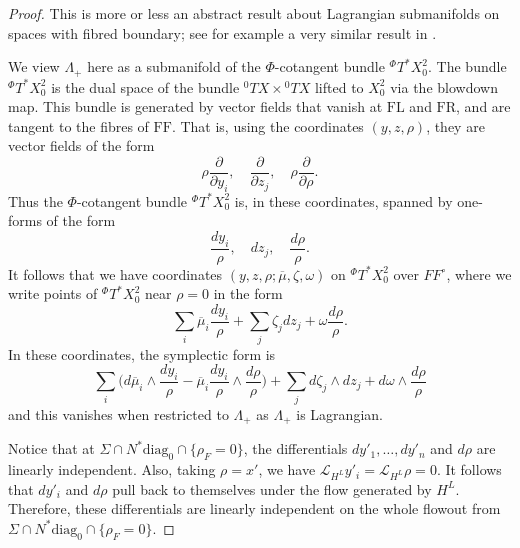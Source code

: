 \documentclass[10pt, a4paper, twoside]{amsart}
\numberwithin{equation}{section}
\theoremstyle{remark}
\begin{document}
\begin{proof} This is more or less an abstract result about Lagrangian submanifolds on spaces with fibred boundary; see for example a very similar result in \cite[Proposition 4.3]{Hassell-Wunsch}.

We view $\Lambda_+$ here as a submanifold of the $\Phi$-cotangent bundle ${}^\Phi T^* X^2_0$. The bundle ${}^\Phi T^* X^2_0$ is the dual space of the bundle ${}^0 TX \times {}^0 TX$ lifted to $X^2_0$ via the blowdown map. This bundle is generated by vector fields that vanish at ${\mathrm{FL}}$ and ${\mathrm{FR}}$, and are tangent to the fibres of ${\mathrm{FF}}$. That is, using the coordinates $(y, z, \rho)$, they are vector fields of the form
$$
\rho \frac{\partial}{\partial y_i}, \quad \frac{\partial}{\partial z_j}, \quad \rho \frac{\partial}{\partial \rho}.
$$
Thus the $\Phi$-cotangent bundle ${}^\Phi T^* X^2_0$ is, in these coordinates, spanned by one-forms of the form
$$
\frac{dy_i}{\rho}, \quad dz_j, \quad \frac{d\rho}{\rho}.
$$
It follows that we have coordinates $(y, z, \rho; \overline{\mu}, \zeta, \omega)$ on ${}^\Phi T^* X^2_0$ over $FF^\circ$, where we write points of  ${}^\Phi T^* X^2_0$ near $\rho = 0$ in the form
$$
\sum_i \overline{\mu}_i \frac{dy_i}{\rho} + \sum_j \zeta_j  dz_j + \omega \frac{d\rho}{\rho}.
$$
In these coordinates, the symplectic form is
\begin{equation}
\sum_i \Big( d\overline{\mu}_i \wedge \frac{dy_i}{\rho} - \overline{\mu}_i   \frac{dy_i}{\rho}  \wedge \frac{d\rho}{\rho} \Big) + \sum_j d\zeta_j  \wedge  dz_j + d\omega \wedge \frac{d\rho}{\rho}
\label{sympl}\end{equation}
and this vanishes when restricted to $\Lambda_+$ as $\Lambda_+$ is Lagrangian.

Notice that at $\Sigma \cap N^* {\mathrm{diag}_0} \cap \{ \rho_F = 0 \}$,
the differentials $dy'_1, \dots, dy'_n$ and $d\rho$ are linearly independent. Also, taking $\rho = x'$, we have $\mathcal{L}_{H^L} y'_i = \mathcal{L}_{H^L} \rho = 0$. It follows that $dy'_i$ and $d\rho$ pull back to themselves under the flow generated by $H^L$. Therefore, these differentials are linearly independent on the whole flowout from $\Sigma \cap N^* {\mathrm{diag}_0} \cap \{ \rho_F = 0 \}$.


\end{proof}
\end{document}
